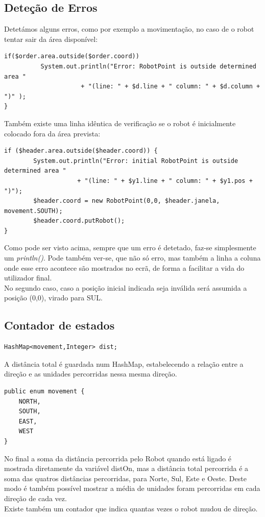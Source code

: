 \documentclass[a4paper,11pt,openright,openbib]{article}
\begin{document}
\subsection{Deteção de Erros} 
Detetámos alguns erros, como por exemplo a movimentação, no caso de o robot tentar sair da área disponível:
\small
\begin{verbatim}
if($order.area.outside($order.coord))
          System.out.println("Error: RobotPoint is outside determined area "
                     + "(line: " + $d.line + " column: " + $d.column + ")" );
}
\end{verbatim}
Também existe uma linha idêntica de verificação se o robot é inicialmente colocado fora da área prevista:
\begin{verbatim}
if ($header.area.outside($header.coord)) {
        System.out.println("Error: initial RobotPoint is outside determined area "
                    + "(line: " + $y1.line + " column: " + $y1.pos + ")");
        $header.coord = new RobotPoint(0,0, $header.janela, movement.SOUTH);
        $header.coord.putRobot();	
} 
\end{verbatim}
\normalsize

Como pode ser visto acima, sempre que um erro é detetado, faz-se simplesmente um \emph{println()}. Pode também ver-se, que não só erro, mas também a linha a coluna onde esse erro acontece são mostrados no ecrã, de forma a facilitar a vida do utilizador final. \\
No segundo caso, caso a posição inicial indicada seja inválida será assumida a posição (0,0), virado para SUL.


\subsection{Contador de estados}
\label{sub:contador_de_estados}
\small
\begin{verbatim}
HashMap<movement,Integer> dist;
\end{verbatim}
\normalsize
A distância total é guardada num HashMap, estabelecendo a relação entre a direção e as unidades percorridas nessa mesma direção.
\small
\begin{verbatim}
public enum movement {
	NORTH,
	SOUTH,
	EAST,
	WEST
}
\end{verbatim}
\normalsize
No final a soma da distância percorrida pelo Robot quando está ligado é mostrada diretamente da variável distOn, mas a distância total percorrida é a soma das quatros distâncias percorridas, para Norte, Sul, Este e Oeste. Deste modo é também possível mostrar a média de unidades foram percorridas em cada direção de cada vez.\\
Existe também um contador que indica quantas vezes o robot mudou de direção.
\end{document}
